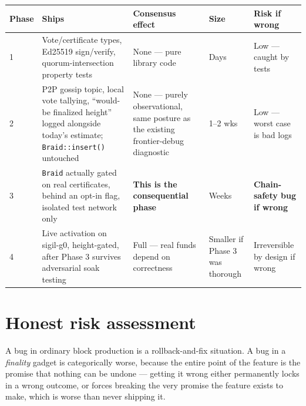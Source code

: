 \documentclass[10pt,a4paper]{article}
\begin{document}
\begin{center}
\small
\begin{tabular}{@{}p{1.6cm}p{4.6cm}p{3.4cm}p{1.6cm}p{2.8cm}@{}}
\toprule
\textbf{Phase} & \textbf{Ships} & \textbf{Consensus effect} & \textbf{Size} & \textbf{Risk if wrong} \\
\midrule
1 & Vote/certificate types, Ed25519 sign/verify, quorum-intersection property tests & None — pure library
code & Days & Low — caught by tests \\
2 & P2P gossip topic, local vote tallying, ``would-be finalized height'' logged alongside today's
estimate; \texttt{Braid::insert()} untouched & None — purely observational, same posture as the existing
frontier-debug diagnostic & 1–2 wks & Low — worst case is bad logs \\
3 & \texttt{Braid} actually gated on real certificates, behind an opt-in flag, isolated test network only
& \textbf{This is the consequential phase} & Weeks & \textbf{Chain-safety bug if wrong} \\
4 & Live activation on sigil-g0, height-gated, after Phase 3 survives adversarial soak testing & Full —
real funds depend on correctness & Smaller if Phase 3 was thorough & Irreversible by design if wrong \\
\bottomrule
\end{tabular}
\end{center}

\section{Honest risk assessment}

A bug in ordinary block production is a rollback-and-fix situation. A bug in a \emph{finality} gadget is
categorically worse, because the entire point of the feature is the promise that nothing can be undone —
getting it wrong either permanently locks in a wrong outcome, or forces breaking the very promise the
feature exists to make, which is worse than never shipping it.
\end{document}
